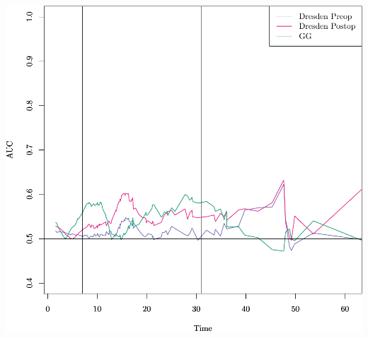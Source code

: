 \documentclass{article}\usepackage[]{graphicx}\usepackage[]{color}
\makeatletter
\def\maxwidth{ %
  \ifdim\Gin@nat@width>\linewidth
    \linewidth
  \else
    \Gin@nat@width
  \fi
}
\newenvironment{knitrout}{}{} %
\makeatother
\begin{document}
\begin{knitrout}
{\centering \includegraphics[width=\maxwidth]{figure/07-risksetROC-dresden-1} 

}



\end{knitrout}
\end{document}
